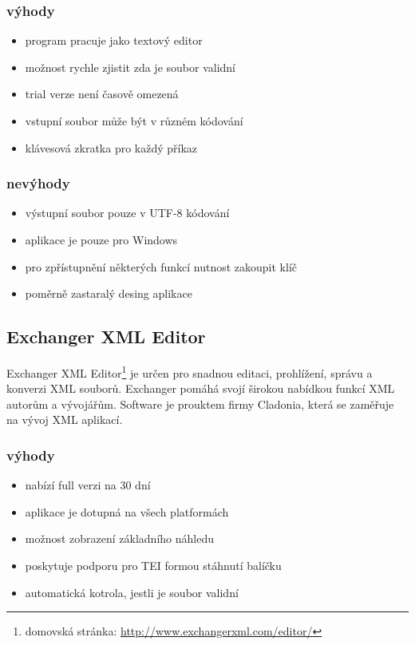             \subsubsection{výhody}
                \begin{itemize}
                    \item program pracuje jako textový editor
                    \item možnost rychle zjistit zda je soubor validní
                    \item trial verze není časově omezená
                    \item vstupní soubor může být v různém kódování
                    \item klávesová zkratka pro každý příkaz
                \end{itemize}
                
            \subsubsection{nevýhody}
                \begin{itemize}
                    \item výstupní soubor pouze v UTF-8 kódování
                    \item aplikace je pouze pro Windows
                    \item pro zpřístupnění některých funkcí nutnost zakoupit klíč
                    \item poměrně zastaralý desing aplikace
                \end{itemize}

        \subsection{Exchanger XML Editor}
            Exchanger XML Editor\footnote{domovská stránka: \url{http://www.exchangerxml.com/editor/}} je určen pro snadnou editaci, prohlížení, správu a konverzi XML souborů. Exchanger pomáhá svojí širokou nabídkou funkcí XML autorům a vývojářům.  Software je prouktem firmy Cladonia, která se zaměřuje na vývoj XML aplikací. 
            
            \subsubsection{výhody}
                \begin{itemize}
                    \item nabízí full verzi na 30 dní
                    \item aplikace je dotupná na všech platformách
                    \item možnost zobrazení základního náhledu
                    \item poskytuje podporu pro TEI formou stáhnutí balíčku
                    \item automatická kotrola, jestli je soubor validní
                \end{itemize}
                
